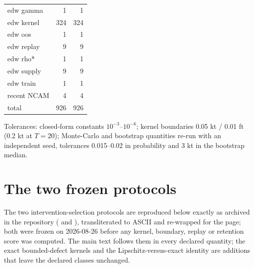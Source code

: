 \documentclass[11pt,a4paper]{article}
\begin{document}
\begin{table}[H]
\begin{tabular}{lrr}
edw gamma & 1 & 1 \\
edw kernel & 324 & 324 \\
edw oos & 1 & 1 \\
edw replay & 9 & 9 \\
edw rho* & 1 & 1 \\
edw supply & 9 & 9 \\
edw train & 1 & 1 \\
recent NCAM & 4 & 4 \\
\midrule
total & 926 & 926 \\
\bottomrule
\end{tabular}
\par\smallskip\begin{minipage}{0.97\linewidth}\footnotesize Tolerances: closed-form constants $10^{-3}$--$10^{-6}$; kernel boundaries 0.05 kt / 0.01 ft (0.2 kt at $T=20$); Monte-Carlo and bootstrap quantities re-run with an independent seed, tolerances 0.015--0.02 in probability and 3 kt in the bootstrap median.\end{minipage}
\end{table}


\section{The two frozen protocols}\label{si:protocols}
The two intervention-selection protocols are reproduced below exactly as archived in the repository ( and ), transliterated to ASCII and re-wrapped for the page; both were frozen on 2026-08-26 before any kernel, boundary, replay or retention score was computed. The main text follows them in every declared quantity; the exact bounded-defect kernels and the Lipschitz-versus-exact identity are additions that leave the declared classes unchanged.
\end{document}
